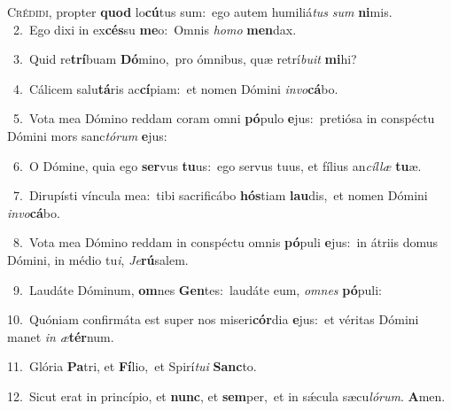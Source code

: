 \lettrine{\initial\textcolor{\initialcolor}{C}}{rédidi,} propter \textbf{quod} lo\-\textbf{cú}\-tus sum:~\star ego autem humiliá\textit{tus} \textit{sum} \textbf{ni}\-mis.\\
{\numbfont\textcolor{\numbcolor}{~2.}}~Ego dixi in ex\-\textbf{cés}\-su \textbf{me}\-o:~\star Omnis \textit{ho}\-\textit{mo} \textbf{men}\-dax.\par
{\numbfont\textcolor{\numbcolor}{~3.}}~Quid re\-\textbf{trí}\-buam \textbf{Dó}\-mino,~\star pro ómnibus, quæ retrí\-\textit{bu}\-\textit{it} \textbf{mi}\-hi?\par
{\numbfont\textcolor{\numbcolor}{~4.}}~Cálicem salu\-\textbf{tá}\-ris ac\-\textbf{cí}\-piam:~\star et nomen Dómini \textit{in}\-\textit{vo}\textbf{cá}bo.\par
{\numbfont\textcolor{\numbcolor}{~5.}}~Vota mea Dómino reddam coram omni \textbf{pó}\-pulo \textbf{e}\-jus:~\star pretiósa in conspéctu Dómini mors sanc\-\textit{tó}\-\textit{rum} \textbf{e}\-jus:\par
{\numbfont\textcolor{\numbcolor}{~6.}}~O Dómine, quia ego \textbf{ser}\-vus \textbf{tu}\-us:~\star ego servus tuus, et fílius an\-\textit{cíl}\-\textit{læ} \textbf{tu}\-æ.\par
{\numbfont\textcolor{\numbcolor}{~7.}}~Dirupísti víncula mea:~\dagger tibi sacrificábo \textbf{hós}\-tiam \textbf{lau}\-dis,~\star et nomen Dómini \textit{in}\-\textit{vo}\textbf{cá}bo.\par
{\numbfont\textcolor{\numbcolor}{~8.}}~Vota mea Dómino reddam in conspéctu omnis \textbf{pó}\-puli \textbf{e}\-jus:~\star in átriis domus Dómini, in médio tu\-\textit{i}\-, \textit{Je}\-\textbf{rú}salem.\par
{\numbfont\textcolor{\numbcolor}{~9.}}~Laudáte Dóminum, \textbf{om}\-nes \textbf{Gen}\-tes:~\star laudáte eum, \textit{om}\-\textit{nes} \textbf{pó}\-puli:\par
{\numbfont\textcolor{\numbcolor}{10.}}~Quóniam confirmáta est super nos miseri\-\textbf{cór}\-dia \textbf{e}\-jus:~\star et véritas Dómini manet \textit{in} \textit{æ}\-\textbf{tér}num.\par
{\numbfont\textcolor{\numbcolor}{11.}}~Glória \textbf{Pa}\-tri, et \textbf{Fí}\-lio,~\star et Spirí\-\textit{tu}\-\textit{i} \textbf{Sanc}\-to.\par
{\numbfont\textcolor{\numbcolor}{12.}}~Sicut erat in princípio, et \textbf{nunc}\-, et \textbf{sem}\-per,~\star et in sǽcula sæcu\-\textit{ló}\-\textit{rum}. \textbf{A}\-men.\par
